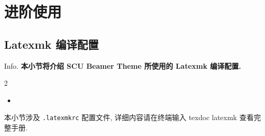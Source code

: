 \section{进阶使用}
\subsection{Latexmk 编译配置}
\begin{frame}{Info.}
	\textbf{本小节将介绍 SCU Beamer Theme 所使用的 Latexmk 编译配置.}
	\begin{multicols}{2}
		\begin{itemize}
			\item {}
		\end{itemize}
	\end{multicols}
	\vspace{2ex}本小节涉及 \texttt{.latexmkrc} 配置文件, 详细内容请在终端输入 \alert{\ttfamily texdoc latexmk} 查看完整手册.
\end{frame}

